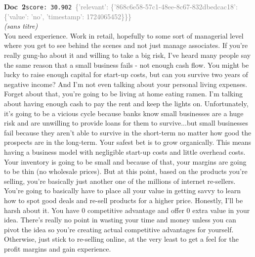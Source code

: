 \documentclass[a4paper,11pt]{article}
\begin{document}
\begin{docenv}
{\footnotesize\textcolor{doccolor}{\textbf{Doc~2}}}\hfill{\tiny\texttt{score:~30.902}}\ {\tiny\textcolor{gray}{\{'relevant': \{'868c6e58-57c1-48ee-8c67-832dbedcac18': \{'value': 'no', 'timestamp': 1724065452\}\}\}}}\\[3pt]
{\small\textit{(sans titre)}}\\[2pt]
\vspace{2pt}
{\footnotesize 
You need experience. Work in retail, hopefully to some sort of managerial level where you get to see behind the scenes and not just manage associates.  If you're really gung-ho about it and willing to take a big risk, I've heard many people say the same reason that a small business fails - not enough cash flow. You might be lucky to raise enough capital for start-up costs, but can you survive two years of negative income? And I'm not even talking about your personal living expenses. Forget about that, you're going to be living at home eating ramen. I'm talking about having enough cash to pay the rent and keep the lights on. Unfortunately, it's going to be a vicious cycle because banks know small businesses are a huge risk and are unwilling to provide loans for them to survive...but small businesses fail because they aren't able to survive in the short-term no matter how good the prospects are in the long-term.   Your safest bet is to grow organically. This means having a business model with negligible start-up costs and little overhead costs. Your inventory is going to be small and because of that, your margins are going to be thin (no wholesale prices). But at this point, based on the products you're selling, you're basically just another one of the millions of internet re-sellers. You're going to basically have to place all your value in getting savvy to learn how to spot good deals and re-sell products for a higher price.   Honestly, I'll be harsh about it. You have 0 competitive advantage and offer 0 extra value in your idea. There's really no point in wasting your time and money unless you can pivot the idea so you're creating actual competitive advantages for yourself. Otherwise, just stick to re-selling online, at the very least to get a feel for the profit margins and gain experience.}
\end{docenv}
\end{document}
